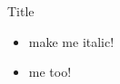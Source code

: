 \documentclass{beamer}
\begin{document}
\begin{frame}{Title}
  \begin{itemize}
    \item \alert{make me italic!}
    \item \alert{me too!}
  \end{itemize}
\end{frame}
\end{document}
